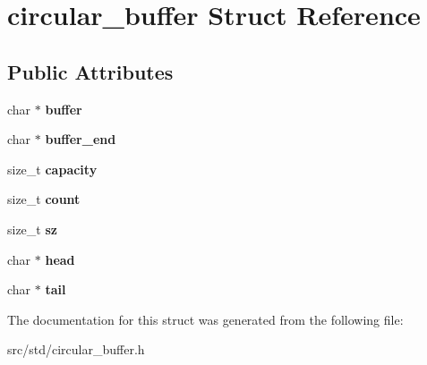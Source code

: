 \hypertarget{structcircular__buffer}{}\section{circular\+\_\+buffer Struct Reference}
\label{structcircular__buffer}
\subsection*{Public Attributes}
\begin{DoxyCompactItemize}
\item 
\mbox{\label{structcircular__buffer_a25d437ecc59bb30f77b02a4cad6c869f}} 
char $\ast$ {\bfseries buffer}
\item 
\mbox{\label{structcircular__buffer_a28c3d64e1d8185a673ee71f44123caf2}} 
char $\ast$ {\bfseries buffer\+\_\+end}
\item 
\mbox{\label{structcircular__buffer_ad5c5dea841ec0edc761c997bd88f59ba}} 
size\+\_\+t {\bfseries capacity}
\item 
\mbox{\label{structcircular__buffer_abf3ee1a580f2f8550005445b950b48bc}} 
size\+\_\+t {\bfseries count}
\item 
\mbox{\label{structcircular__buffer_a4e412a3634fda5e8632814efa52df825}} 
size\+\_\+t {\bfseries sz}
\item 
\mbox{\label{structcircular__buffer_a392e56ba0b3661d5f0f8d4d27fa75e01}} 
char $\ast$ {\bfseries head}
\item 
\mbox{\label{structcircular__buffer_a1f266e3c759638c5d3c45bc9cfeaadef}} 
char $\ast$ {\bfseries tail}
\end{DoxyCompactItemize}


The documentation for this struct was generated from the following file\+:\begin{DoxyCompactItemize}
\item 
src/std/circular\+\_\+buffer.\+h\end{DoxyCompactItemize}
